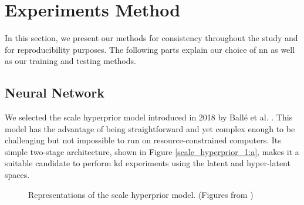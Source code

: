 \documentclass{article}
\begin{document}
\section{Experiments Method}
\label{method}
In this section, we present our methods for consistency throughout the study and for reproducibility purposes. The following parts explain our choice of \acrshort{nn} as well as our training and testing methods.

\subsection{Neural Network}
We selected the scale hyperprior model introduced in 2018 by Ballé et al. \cite{balle2018variationalimagecompressionscale}. This model has the advantage of being straightforward and yet complex enough to be challenging but not impossible to run on resource-constrained computers. Its simple two-stage architecture, shown in Figure \ref{scale_hyperprior_1:a}, makes it a suitable candidate to perform \acrshort{kd} experiments using the latent and hyper-latent spaces.

\begin{figure}
    \centering
    \qquad
    \caption[Representations of the scale hyperprior model.]{Representations of the scale hyperprior model. (Figures from \cite{balle2018variationalimagecompressionscale})}
    \label{scale_hyperprior_1}
\end{figure}
\end{document}
